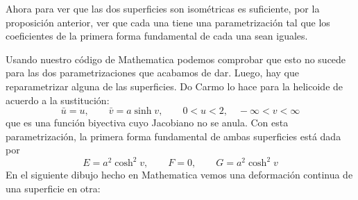 \documentclass[spanish]{book}
\theoremstyle{definition}
\begin{document}
Ahora para ver que las dos superficies son isométricas es suficiente, por la proposición anterior, ver que cada una tiene una parametrización tal que los coeficientes de la primera forma fundamental de cada una sean iguales.

Usando nuestro código de Mathematica podemos comprobar que esto no sucede para las dos parametrizaciones que acabamos de dar. Luego, hay que reparametrizar alguna de las superficies. Do Carmo lo hace para la helicoide de acuerdo a la sustitución:
$$
\bar{u}=u,\qquad\bar{v}=a\sinh{v},\qquad 0<u<2,\quad-\infty<v<\infty
$$
que es una función biyectiva cuyo Jacobiano no se anula. Con esta parametrización, la primera forma fundamental de ambas superficies está dada por
$$
E=a^2\cosh^2{v},\qquad F=0,\qquad G=a^2\cosh^2v
$$
En el siguiente dibujo hecho en Mathematica vemos una deformación continua de una superficie en otra:
	\vspace{-.6cm}
\end{document}
